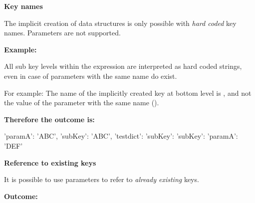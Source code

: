 
\newpage

\textbf{Key names}

The implicit creation of data structures is only possible with \textit{hard coded} key names. Parameters are not supported.

\vspace{2ex}

\textbf{Example:}


All sub key levels within the expression  are interpreted as hard coded strings, even in case of parameters with the same name do exist.

For example: The name of the implicitly created key at bottom level is , and not the value  of the parameter with the same name ().

\vspace{2ex}

\textbf{Therefore the outcome is:}

\begin{pythonlog}
{'paramA': 'ABC', 'subKey': 'ABC', 'testdict': {'subKey': {'subKey': {'paramA': 'DEF'}}}}
\end{pythonlog}

\vspace{2ex}

\textbf{Reference to existing keys}

It is possible to use parameters to refer to \textit{already existing} keys.


\vspace{2ex}

\textbf{Outcome:}

